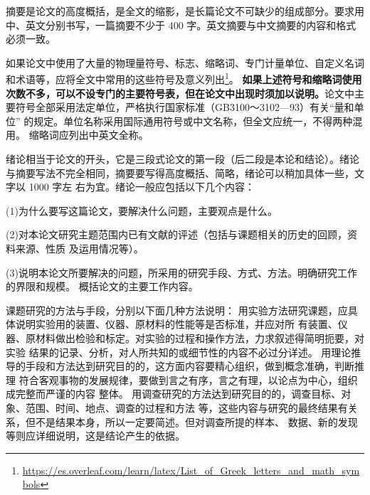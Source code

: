 


摘要是论文的高度概括，是全文的缩影，是长篇论文不可缺少的组成部分。要求用中、英文分别书写，一篇摘要不少于 400 字。英文摘要与中文摘要的内容和格式必须一致。


如果论文中使用了大量的物理量符号、标志、缩略词、专门计量单位、自定义名词和术语等，应将全文中常用的这些符号及意义列出\footnote{\url{https://es.overleaf.com/learn/latex/List_of_Greek_letters_and_math_symbols}}。 \textbf{如果上述符号和缩略词使用次数不多，可以不设专门的主要符号表，但在论文中出现时须加以说明。}论文中主要符号全部采用法定单位，严格执行国家标准（GB3100～3102—93）有关“量和单位”
的规定。单位名称采用国际通用符号或中文名称，但全文应统一，不得两种混用。 缩略词应列出中英文全称。



绪论相当于论文的开头，它是三段式论文的第一段（后二段是本论和结论）。绪论
与摘要写法不完全相同，摘要要写得高度概括、简略，绪论可以稍加具体一些，文字以 1000 字左 右为宜。绪论一般应包括以下几个内容： 

(1)为什么要写这篇论文，要解决什么问题，主要观点是什么。

(2)对本论文研究主题范围内已有文献的评述（包括与课题相关的历史的回顾，资料来源、性质
及运用情况等）。

(3)说明本论文所要解决的问题，所采用的研究手段、方式、方法。明确研究工作的界限和规模。
概括论文的主要工作内容。

课题研究的方法与手段，分别以下面几种方法说明： 用实验方法研究课题，应具体说明实验用的装置、仪器、原材料的性能等是否标准，并应对所
有装置、仪器、原材料做出检验和标定。对实验的过程和操作方法，力求叙述得简明扼要，对实验 结果的记录、分析，对人所共知的或细节性的内容不必过分详述。 用理论推导的手段和方法达到研究目的的，这方面内容要精心组织，做到概念准确，判断推理
符合客观事物的发展规律，要做到言之有序，言之有理，以论点为中心，组织成完整而严谨的内容 整体。
用调查研究的方法达到研究目的的，调查目标、对象、范围、时间、地点、调查的过程和方法
等，这些内容与研究的最终结果有关系，但不是结果本身，所以一定要简述。但对调查所提的样本、 数据、新的发现等则应详细说明，这是结论产生的依据。


